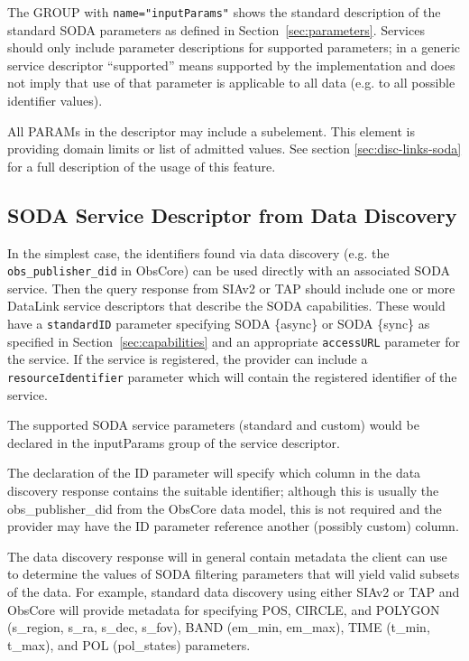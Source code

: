 \documentclass[11pt,a4paper]{ivoa}
\begin{document}
The GROUP with \verb|name="inputParams"| shows the standard
description of the standard SODA parameters as defined in
Section~\ref{sec:parameters}. Services should only include parameter
descriptions for supported parameters; in a generic service descriptor
``supported'' means supported by the implementation and does not imply
that use of that parameter is applicable to all data (e.g. to all
possible identifier values).


All PARAMs in the descriptor may include a  subelement. This
element is  providing  domain limits or list of admitted
values. See section \ref{sec:disc-links-soda} for a full description of the usage of this feature.


\subsection{SODA Service Descriptor from Data Discovery}
\label{sec:disc-soda}

In the simplest case, the identifiers found via data discovery (e.g. the
\texttt{obs\_publisher\_did} in ObsCore) can be
used directly with an associated SODA service. Then the query response from
SIAv2  or TAP should include one or
more DataLink service descriptors that describe the
SODA capabilities. These would have a \texttt{standardID} parameter
specifying SODA \{async\} or SODA \{sync\} as specified in
Section~\ref{sec:capabilities} and an appropriate \texttt{accessURL}
parameter for the service. If the service is registered, the provider
can include a \texttt{resourceIdentifier} parameter which will contain 
the registered identifier of the service. 

The supported SODA
service parameters (standard and custom) would be declared in the
inputParams group of the service descriptor. 

The declaration of the ID parameter will specify which column in the
data discovery response contains the  suitable identifier; although this
is usually the obs\_publisher\_did from the ObsCore data model, this is
not required and the provider may have the ID parameter reference
another (possibly custom) column.

The data discovery response will in general contain metadata the client
can use to determine the values of SODA filtering parameters that will
yield valid subsets of the data. For example, standard data discovery
using either SIAv2 or TAP and ObsCore will provide metadata for
specifying POS, CIRCLE, and POLYGON (s\_region, s\_ra, s\_dec, s\_fov),
BAND (em\_min, em\_max), TIME (t\_min, t\_max), and POL (pol\_states)
parameters.
\end{document}
